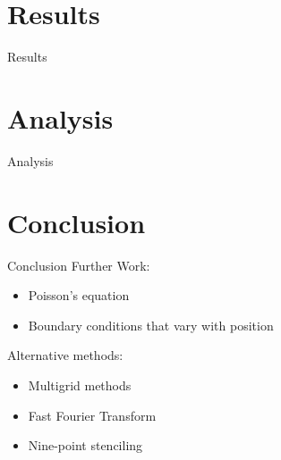 \documentclass{beamer}
\begin{document}
\section{Results}

\begin{frame}{Results}
\end{frame}

\section{Analysis}
\begin{frame}{Analysis}
\end{frame}

\section{Conclusion}

\begin{frame}{Conclusion}
Further Work:
\begin{itemize}
\item Poisson's equation
\item Boundary conditions that vary with position
\end{itemize}

Alternative methods:
\begin{itemize}
\item Multigrid methods
\item Fast Fourier Transform
\item Nine-point stenciling
\end{itemize}

\end{frame}

\begin{frame}
\titlepage
\end{frame}
\end{document}
